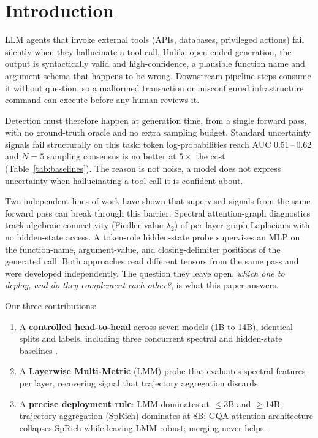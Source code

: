\documentclass{article}
\begin{document}
\section{Introduction}
\label{sec:intro}

LLM agents that invoke external tools (APIs, databases, privileged
actions) fail silently when they hallucinate a tool call.  Unlike
open-ended generation, the output is syntactically valid and
high-confidence, a plausible function name and argument schema that
happens to be wrong.  Downstream pipeline steps consume it without
question, so a malformed transaction or misconfigured
infrastructure command can execute before any human reviews it.

Detection must therefore happen at generation time, from a single
forward pass, with no ground-truth oracle and no extra sampling budget.
Standard uncertainty signals fail structurally on this task: token
log-probabilities reach AUC 0.51\,--\,0.62 and $N{=}5$ sampling
consensus is no better at $5\times$ the cost
(Table~\ref{tab:baselines}).  The reason is not noise, a model does
not express uncertainty when hallucinating a tool call it is confident
about.

Two independent lines of work have shown that supervised signals from
the same forward pass can break through this barrier.  Spectral
attention-graph diagnostics \cite{noel2026geometry} track algebraic
connectivity (Fiedler value $\lambda_2$) of per-layer graph Laplacians
with no hidden-state access.  A token-role hidden-state probe
\cite{healy2026internal} supervises an MLP on the function-name,
argument-value, and closing-delimiter positions of the generated call.
Both approaches read different tensors from the same pass and were
developed independently.  The question they leave open, \emph{which
one to deploy, and do they complement each other?}, is what this
paper answers.

Our three contributions:
\begin{enumerate}[noitemsep,topsep=2pt,leftmargin=*]
  \item A \textbf{controlled head-to-head} across seven models (1B to
    14B), identical splits and labels, including three concurrent
    spectral and hidden-state baselines
    \cite{binkowski2025hallucination,li2025llm,badash2026between}.
  \item A \textbf{Layerwise Multi-Metric} (LMM) probe that evaluates
    spectral features per layer, recovering signal that trajectory
    aggregation discards.
  \item A \textbf{precise deployment rule}: LMM dominates at
    ${\leq}$3B and ${\geq}$14B; trajectory aggregation (SpRich)
    dominates at 8B; GQA attention architecture
    collapses SpRich while leaving LMM robust; merging never helps.
\end{enumerate}
\end{document}
